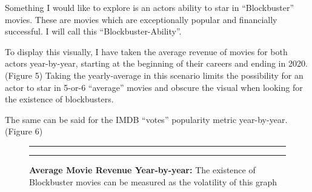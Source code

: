 \documentclass[]{article}
\begin{document}
\noindent Something I would like to explore is an actors ability to star
in ``Blockbuster'' movies. These are movies which are exceptionally
popular and financially successful. I will call this
``Blockbuster-Ability''. \newline

\noindent To display this visually, I have taken the average revenue of
movies for both actors year-by-year, starting at the beginning of their
careers and ending in 2020. (Figure 5) Taking the yearly-average in this
scenario limits the possibility for an actor to star in 5-or-6
``average'' movies and obscure the visual when looking for the existence
of blockbusters. \newline

\noindent The same can be said for the IMDB ``votes'' popularity metric
year-by-year. (Figure 6)

\begin{figure}[!ht]
 \label{fig:one-graphic}
    \begin{center}
    \end{center}
    \hrule
      \vspace{2mm}
    \caption{ \textbf{Average Movie Revenue Year-by-year:} \newline \footnotesize{ The existence
    of Blockbuster movies can be measured as the volatility of this graph}  }
    \vspace{2mm}
    \hrule
\end{figure}
\end{document}
